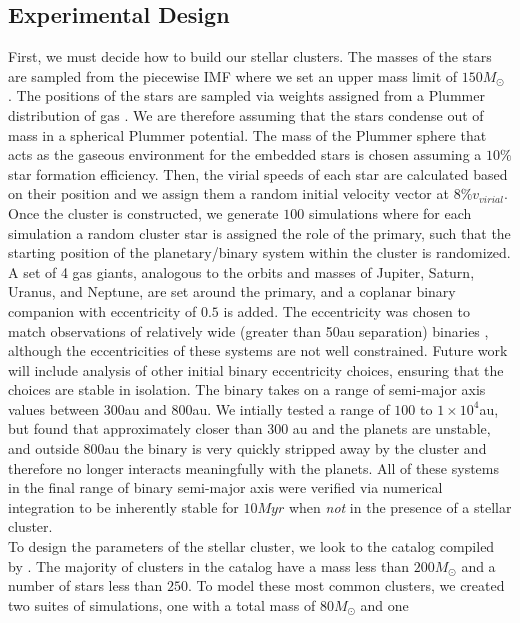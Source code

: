 \documentclass{aastex631}
\begin{document}
\subsection{Experimental Design}
First, we must decide how to build our stellar clusters. The masses of the stars are sampled from the \citet{cha03} piecewise IMF  where we set
an upper mass limit of $150 M_{\odot}$ \citep{wei04}.
The positions of the stars are sampled via weights assigned from a Plummer distribution of gas \citep{plu11}. We are therefore assuming that the stars
condense out of mass in a spherical Plummer potential. The mass of the Plummer sphere that acts as the gaseous environment for the
embedded stars is chosen assuming a $10\%$ star formation efficiency. Then, the virial speeds of each star are calculated based on their position
and we assign them a random initial velocity vector at $8\% v_{virial}$\cite{lev10}. Once the cluster is constructed, we generate $100$ simulations
where for each simulation a random cluster star is assigned the role of the primary, such that the starting position of the planetary/binary system
within the cluster is randomized.
A set of 4 gas giants, analogous to the orbits and 
masses of Jupiter, Saturn, Uranus, and Neptune, are set around the primary, and a coplanar binary companion with eccentricity of 
$0.5$ is added. The eccentricity was chosen to match observations of relatively wide (greater
than 50au separation) binaries \citep{tok16}, although the eccentricities of these systems are not well constrained. Future work will include
analysis of other initial binary eccentricity choices, ensuring that the choices are stable in isolation.
The binary takes on a range of semi-major axis values between $300$au and $800$au. We intially tested
a range of $100$ to $1\times 10^4$au, but found that approximately closer than $300$ au and the planets are unstable, and outside $800$au 
the binary is very quickly stripped away by the cluster and therefore no longer interacts meaningfully with the planets. 
 All of these systems in the final range of binary semi-major axis were verified via numerical integration to be inherently stable for $10 Myr$ when \textit{not} 
 in the presence of a stellar cluster. \\
\indent To design the parameters of the stellar cluster, we look to the catalog compiled by \citet{lad03}. The majority of clusters in the catalog have a mass less than
$200M_{\odot}$ and a number of stars less than $250$. To model these most common clusters, we created two suites of simulations, one with a total mass of $80M_{\odot}$ and one
\end{document}
